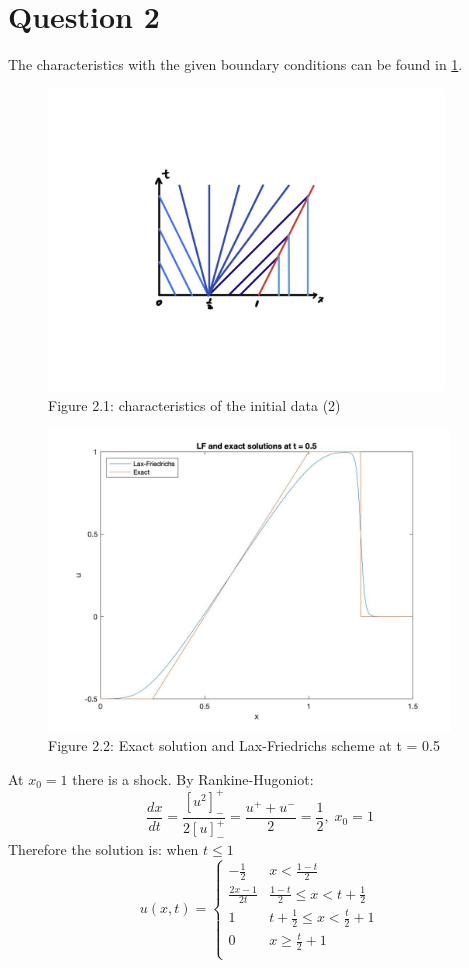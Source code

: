 \documentclass[a4paper,11pt]{article}
\begin{document}
\section{Question 2}
The characteristics with the given boundary conditions can be found in \ref{Q2}.
\begin{figure}[H]
\center
 \includegraphics[width = 0.9\linewidth, height =8cm]{Q2.jpg}
\caption{Figure 2.1: characteristics of the initial data (2)}
\label{Q2}
\end{figure}
\begin{figure}[H]
 \includegraphics[width = 0.9\linewidth, height =8cm]{Q2(1).jpg}
\caption{Figure 2.2: Exact solution and Lax-Friedrichs scheme at t = 0.5}
\label{Q2(1)}
\end{figure}
\newpage
At $x_0 = 1$ there is a shock. By Rankine-Hugoniot: $$\frac{dx}{dt} = \frac{\left[u^2\right]_{-}^{+}}{2\left[u\right]_{-}^{+}} = \frac{u^{+} +u^{-}}{2} = \frac{1}{2},\;x_0 = 1 $$ 
Therefore the solution is: when $t\leqslant 1$
\[
 u(x,t)=\begin{cases}
               -\frac{1}{2} & x< \frac{1-t}{2}\\
               \frac{2x-1}{2t} & \frac{1-t}{2}\leqslant x<t+\frac{1}{2}\\ 
               1 & t+\frac{1}{2}\leqslant x <\frac{t}{2}+1 \\
               0 & x\geqslant \frac{t}{2}+1\\
            \end{cases}
\] 
\end{document}
